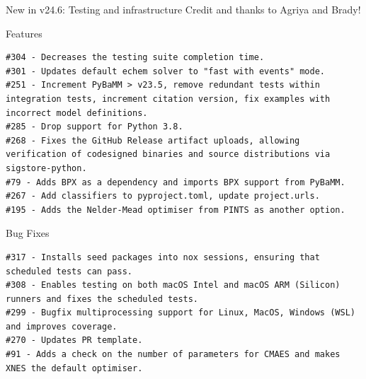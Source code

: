\documentclass[aspectratio=169]{beamer}
\begin{document}
\begin{frame}[fragile,t]{New in v24.6: Testing and infrastructure}
    \vspace{-6mm}
    Credit and thanks to Agriya and Brady!
    \begin{block}{Features}
    \begin{lstlisting}[firstnumber=1, xleftmargin=10pt]
#304 - Decreases the testing suite completion time.
#301 - Updates default echem solver to "fast with events" mode.
#251 - Increment PyBaMM > v23.5, remove redundant tests within integration tests, increment citation version, fix examples with incorrect model definitions.
#285 - Drop support for Python 3.8.
#268 - Fixes the GitHub Release artifact uploads, allowing verification of codesigned binaries and source distributions via sigstore-python.
#79 - Adds BPX as a dependency and imports BPX support from PyBaMM.
#267 - Add classifiers to pyproject.toml, update project.urls.
#195 - Adds the Nelder-Mead optimiser from PINTS as another option.
    \end{lstlisting}
    \end{block}
    \begin{block}{Bug Fixes}
    \begin{lstlisting}[firstnumber=1, xleftmargin=10pt]
#317 - Installs seed packages into nox sessions, ensuring that scheduled tests can pass.
#308 - Enables testing on both macOS Intel and macOS ARM (Silicon) runners and fixes the scheduled tests.
#299 - Bugfix multiprocessing support for Linux, MacOS, Windows (WSL) and improves coverage.
#270 - Updates PR template.
#91 - Adds a check on the number of parameters for CMAES and makes XNES the default optimiser.
    \end{lstlisting}
    \end{block}
\end{frame}
\end{document}
